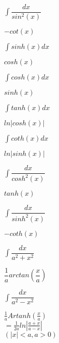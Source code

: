 \documentclass[a8paper,14pt,grid=none%
,print			%
]{kartei}
\begin{document}
	\begin{karte}{$ \int \dfrac{dx}{sin^2(x)} $}
		\begin{center}
			$ -cot(x) $
		\end{center}
	\end{karte}

	\begin{karte}{$ \int sinh(x) dx $}
		\begin{center}
			$ cosh(x) $
		\end{center}
	\end{karte}

	\begin{karte}{$ \int cosh(x) dx $}
		\begin{center}
			$ sinh(x) $
		\end{center}
	\end{karte}

	\begin{karte}{$ \int tanh(x) dx $}
		\begin{center}
			$ ln|cosh(x)| $
		\end{center}
	\end{karte}

	\begin{karte}{$ \int coth(x) dx $}
		\begin{center}
			$ ln|sinh(x)| $
		\end{center}
	\end{karte}

	\begin{karte}{$ \int \dfrac{dx}{cosh^2(x)} $}
		\begin{center}
			$ tanh(x) $
		\end{center}
	\end{karte}

	\begin{karte}{$ \int \dfrac{dx}{sinh^2(x)} $}
		\begin{center}
			$ -coth(x) $
		\end{center}
	\end{karte}
	
	\begin{karte}{$ \int \dfrac{dx}{a^2+x^2} $}
		\begin{center}
			$ \dfrac{1}{a} arctan\left( \dfrac{x}{a} \right) $
		\end{center}
	\end{karte}

	\begin{karte}{$ \int \dfrac{dx}{a^2-x^2} $}
		\begin{center}
			$ \frac{1}{a} Artanh\left( \frac{x}{a} \right) $\\
			$ = \frac{1}{2a}ln\left|\frac{a+x}{a-x}\right| $\\[10pt]
			$ (|x|<a, a>0) $
		\end{center}
	\end{karte}
\end{document}
